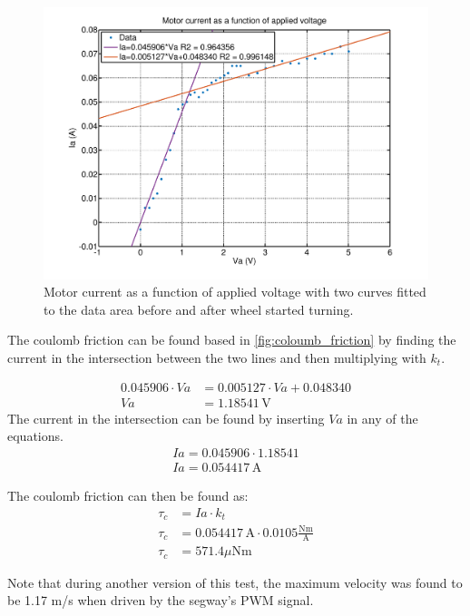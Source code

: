\begin{figure}[H]
	\centering
	\includegraphics[width=\textwidth]{figures/motorMeasurements/coloumb_friction.pdf}
	\caption{Motor current as a function of applied voltage with two curves fitted to the data area before and after wheel started turning.}
	\label{fig:coloumb_friction}
\end{figure}

The coulomb friction can be found based in \autoref{fig:coloumb_friction} by finding the current in the intersection between the two lines and then multiplying with $k_t$.

\begin{align}
	0.045906 \cdot Va&=0.005127 \cdot Va+0.048340\\
	Va&=1.18541 \, \text{V}
\end{align}
The current in the intersection can be found by inserting $Va$ in any of the equations.
\begin{align}
	Ia=0.045906 \cdot 1.18541\\
	Ia=0.054417 \, \text{A}
\end{align}

The coulomb friction can then be found as:
\begin{align}
	\tau_c &= Ia \cdot k_t\\
	\tau_c &= 0.054417 \, \text{A} \cdot 0.0105 \frac{\text{Nm}}{\text{A}}\\
	\tau_c &= 571.4 \mu \text{Nm}
\end{align}

Note that during another version of this test, the maximum velocity was found to be 1.17 m/s when driven by the segway's PWM signal. 

